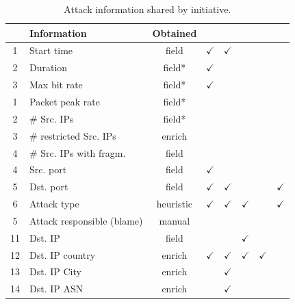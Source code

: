\documentclass{llncs}
\begin{document}
\begin{table}[h!] 
\small 
\center 
\caption{Attack information shared by initiative.}
\label{tab:attack_fields} 

\begin{tabular}{|c| l | c |c|c|c|c|c|} 
\hline
&\textbf{Information}      & \textbf{Obtained}&\cite{digitalattackmap2013web} &
\cite{norse2015web}& \cite{ipew2015web}  & \cite{fireeye2015web} &
\cite{kaspersky2015web2}\\ \hline

1&Start time 	&field&  $\checkmark$	& $\checkmark$	& ~& ~ & ~    \\ \hline    
2&Duration 		&field*& $\checkmark$	& ~ & ~& ~ & ~   \\ \hline 
3&Max bit rate	&field*& $\checkmark$	& ~ & ~ & ~ & ~\\ \hline 
1& Packet peak rate & field*&&&&&\\ \hline
2&\# Src. IPs &field*&&&&&\\\hline	
3&\# restricted Src. IPs & enrich &&&&&\\\hline 
4&\# Src. IPs with fragm. & field&&&&& \\\hline
4&Src.  port 		&field& $\checkmark$	& ~ & ~ & ~ & ~   \\\hline 
5&Dst.  port &field& $\checkmark$	& $\checkmark$	& ~ & ~ & $\checkmark$\\ \hline 
6&Attack type&heuristic& $\checkmark$ & $\checkmark$	& $\checkmark$ &~ & $\checkmark$    \\ \hline 
5&Attack responsible (blame)& manual&&&&&\\\hline\hline\hline

\rowcolor{red}11&Dst.  IP &field& ~ & ~ & $\checkmark$& ~ & ~ \\\hline
12&Dst. IP country&enrich& $\checkmark$ & $\checkmark$	& $\checkmark$& $\checkmark$ & ~ \\ \hline 
\rowcolor{red}13&Dst. IP City &enrich& ~ & $\checkmark$	& ~ & ~ & ~   \\\hline 
\rowcolor{red}14&Dst. IP ASN &enrich& ~ & $\checkmark$ & ~ & ~ & ~ \\ \hline\hline\hline


\end{tabular}
\end{table}
\end{document}
